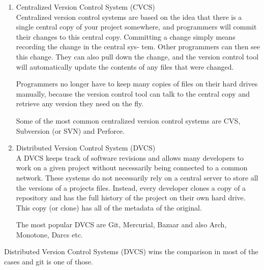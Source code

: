 \begin{enumerate}

\item{Centralized Version Control System (CVCS)}  \hfill \\

  Centralized version control systems are based on the idea that there
  is a single central copy of your project somewhere, and programmers
  will commit their changes to this central copy. Committing a change
  simply means recording the change in the central sys- tem. Other
  programmers can then see this change. They can also pull down the
  change, and the version control tool will automatically update the
  contents of any files that were changed.

  Programmers no longer have to keep many copies of files on their
  hard drives manually, because the version control tool can talk to
  the central copy and retrieve any version they need on the fly.

  Some of the most common centralized version control systems are CVS,
  Subversion (or SVN) and Perforce.

\item{Distributed Version Control System (DVCS)}  \hfill \\
  A DVCS keeps track of software revisions and allows many developers
  to work on a given project without necessarily being connected to a
  common network. These systems do not necessarily rely on a central
  server to store all the versions of a projects files. Instead, every
  developer clones a copy of a repository and has the full history of
  the project on their own hard drive. This copy (or clone) has all of
  the metadata of the original.

  The most popular DVCS are Git, Mercurial, Bazaar and also Arch,
  Monotone, Darcs etc.
\end{enumerate}

Distributed Version Control Systems (DVCS) wins the comparison in most
of the cases and git is one of those.
